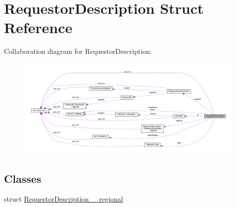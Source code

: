 \hypertarget{structRequestorDescription}{}\section{Requestor\+Description Struct Reference}
\label{structRequestorDescription}


Collaboration diagram for Requestor\+Description\+:\nopagebreak
\begin{figure}[H]
\begin{center}
\leavevmode
\includegraphics[width=350pt]{structRequestorDescription__coll__graph}
\end{center}
\end{figure}
\subsection*{Classes}
\begin{DoxyCompactItemize}
\item 
struct \hyperlink{structRequestorDescription_1_1RequestorDescription____regional}{Requestor\+Description\+\_\+\+\_\+regional}
\end{DoxyCompactItemize}
